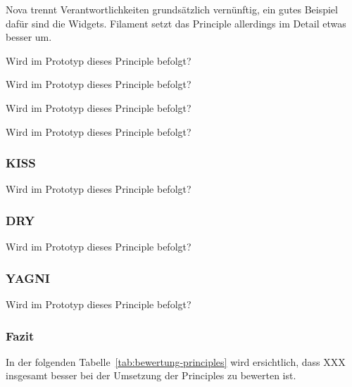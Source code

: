 Nova trennt Verantwortlichkeiten grundsätzlich vernünftig, ein gutes Beispiel dafür sind die Widgets.
Filament setzt das Principle allerdings im Detail etwas besser um.

\color{red}
Wird im Prototyp dieses Principle befolgt?

Wird im Prototyp dieses Principle befolgt?

Wird im Prototyp dieses Principle befolgt?

Wird im Prototyp dieses Principle befolgt?

\subsubsection{KISS}
Wird im Prototyp dieses Principle befolgt?

\subsubsection{DRY}
Wird im Prototyp dieses Principle befolgt?

\subsubsection{YAGNI}
Wird im Prototyp dieses Principle befolgt?

\subsubsection{Fazit}
In der folgenden Tabelle~\ref{tab:bewertung-principles} wird ersichtlich, dass XXX insgesamt besser bei der Umsetzung der Principles zu bewerten ist.


